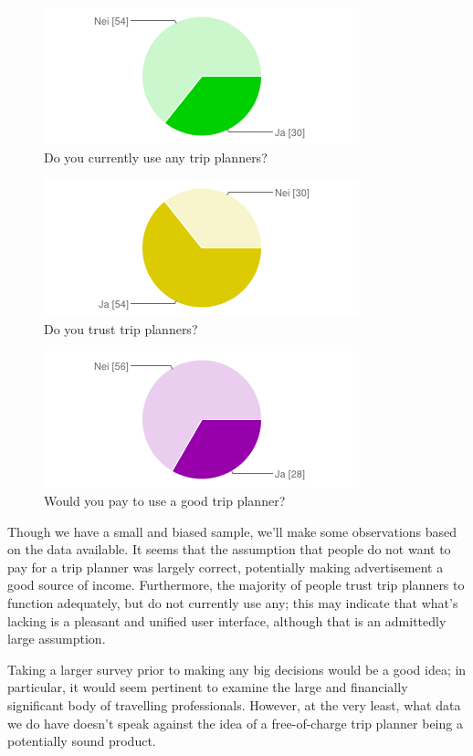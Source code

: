 \begin{figure}[!h]
    \centering
    \includegraphics[scale=0.5]{charts/benytter-du-deg-av-noen-reiseplanlegger.png}
    \caption{Do you currently use any trip planners?}
\end{figure}

\begin{figure}[!h]
    \centering
    \includegraphics[scale=0.5]{charts/stoler-du-paa-reiseplanleggere.png}
    \caption{Do you trust trip planners?}
\end{figure}

\begin{figure}[!h]
    \centering
    \includegraphics[scale=0.5]{charts/ville-du-betalt.png}
    \caption{Would you pay to use a good trip planner?}
\end{figure}

Though we have a small and biased sample, we'll make some observations based
on the data available. It seems that the assumption that people do not want to
pay for a trip planner was largely correct, potentially making advertisement a
good source of income. Furthermore, the majority of people trust trip planners
to function adequately, but do not currently use any; this may indicate that
what's lacking is a pleasant and unified user interface, although that is an
admittedly large assumption.

Taking a larger survey prior to making any big decisions would be a good idea;
in particular, it would seem pertinent to examine the large and financially
significant body of travelling professionals. However, at the very least,
what data we do have doesn't speak against the idea of a free-of-charge trip
planner being a potentially sound product.
